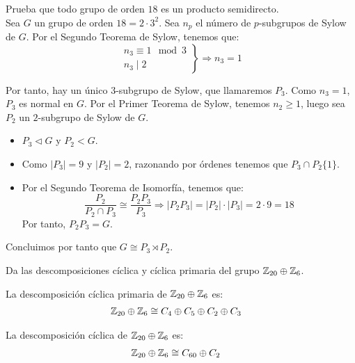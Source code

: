 \documentclass[12pt]{article}
\begin{document}
    \begin{ejercicio}\label{ej:grupo-orden-18}
        Prueba que todo grupo de orden $18$ es un producto semidirecto.\\

        Sea $G$ un grupo de orden $18=2\cdot 3^2$. Sea $n_p$ el número de $p$-subgrupos de Sylow de $G$. Por el Segundo Teorema de Sylow, tenemos que:
        \begin{equation*}
            \left.\begin{array}{l}
                n_3 \equiv 1 \mod 3\\
                n_3 \mid 2
            \end{array}\right\}
            \Longrightarrow n_3=1
        \end{equation*}

        Por tanto, hay un único $3$-subgrupo de Sylow, que llamaremos $P_3$. Como $n_3=1$, $P_3$ es normal en $G$. Por el Primer Teorema de Sylow, tenemos $n_2\geq 1$, luego sea $P_2$ un $2$-subgrupo de Sylow de $G$.
        \begin{itemize}
            \item $P_3\lhd G$ y $P_2<G$.
            \item Como $|P_3|=9$ y $|P_2|=2$, razonando por órdenes tenemos que $P_3\cap P_2\{1\}$.
            \item Por el Segundo Teorema de Isomorfía, tenemos que:
            \begin{equation*}
                \dfrac{P_2}{P_2\cap P_3} \cong \dfrac{P_2P_3}{P_3}
                \Longrightarrow |P_2P_3| = |P_2|\cdot |P_3| = 2\cdot 9 = 18
            \end{equation*}
            Por tanto, $P_2P_3=G$.
        \end{itemize}

        Concluimos por tanto que $G\cong P_3\rtimes P_2$.
    \end{ejercicio}

    \begin{ejercicio}
        Da las descomposiciones cíclica y cíclica primaria del grupo $\mathbb{Z}_{20} \oplus \mathbb{Z}_6$.

        La descomposición cíclica primaria de $\mathbb{Z}_{20} \oplus \mathbb{Z}_6$ es:
        \begin{align*}
            \mathbb{Z}_{20} \oplus \mathbb{Z}_6 & \cong C_4 \oplus C_5 \oplus C_2 \oplus C_3
        \end{align*}

        La descomposición cíclica de $\mathbb{Z}_{20} \oplus \mathbb{Z}_6$ es:
        \begin{align*}
            \mathbb{Z}_{20} \oplus \mathbb{Z}_6 & \cong C_{60} \oplus C_2
        \end{align*}
    \end{ejercicio}
\end{document}

